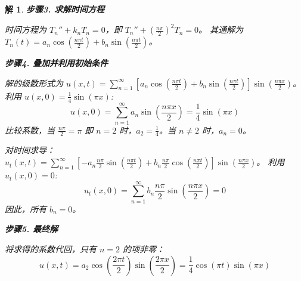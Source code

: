 \documentclass[12pt,a4paper]{article}
\newtheorem*{solution}{解}
\begin{document}
\begin{solution}
		\hrulefill
		
		\textbf{步骤3. 求解时间方程}
		
		\noindent
		时间方程为 $T_n'' + k_n T_n = 0$，即 $T_n'' + \left(\frac{n\pi}{2}\right)^2 T_n = 0$。
		其通解为 $T_n(t) = a_n \cos\left(\frac{n\pi t}{2}\right) + b_n \sin\left(\frac{n\pi t}{2}\right)$。
		
		\hrulefill
		
		\textbf{步骤4. 叠加并利用初始条件}
		
		\noindent
		解的级数形式为 $u(x,t) = \sum_{n=1}^\infty \left[ a_n \cos\left(\frac{n\pi t}{2}\right) + b_n \sin\left(\frac{n\pi t}{2}\right) \right] \sin\left(\frac{n\pi x}{2}\right)$。
		利用 $u(x,0) = \frac{1}{4}\sin(\pi x)$:
		\[ u(x,0) = \sum_{n=1}^\infty a_n \sin\left(\frac{n\pi x}{2}\right) = \frac{1}{4}\sin(\pi x) \]
		比较系数，当 $\frac{n\pi}{2} = \pi$ 即 $n=2$ 时，$a_2 = \frac{1}{4}$。当 $n \neq 2$ 时，$a_n=0$。
		
		对时间求导：$u_t(x,t) = \sum_{n=1}^\infty \left[ -a_n\frac{n\pi}{2}\sin\left(\frac{n\pi t}{2}\right) + b_n\frac{n\pi}{2}\cos\left(\frac{n\pi t}{2}\right) \right] \sin\left(\frac{n\pi x}{2}\right)$。
		利用 $u_t(x,0) = 0$:
		\[ u_t(x,0) = \sum_{n=1}^\infty b_n \frac{n\pi}{2} \sin\left(\frac{n\pi x}{2}\right) = 0 \]
		因此，所有 $b_n=0$。
		
		\hrulefill
		
		\textbf{步骤5. 最终解}
		
		\noindent
		将求得的系数代回，只有 $n=2$ 的项非零：
		\[ u(x,t) = a_2 \cos\left(\frac{2\pi t}{2}\right) \sin\left(\frac{2\pi x}{2}\right) = \frac{1}{4}\cos(\pi t)\sin(\pi x) \]
	\end{solution}
	
	\newpage
\end{document}
